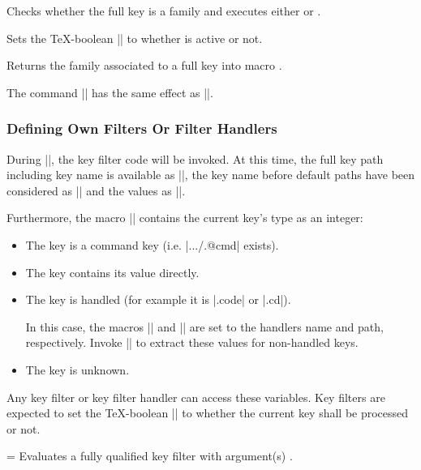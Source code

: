 \begin{command}{\pgfkeysiffamilydefined{}}%
	Checks whether the full key  is a family and executes either  or .
\end{command}

\begin{command}{\pgfkeysisfamilyactive{}}%
	Sets the \TeX-boolean |\ifpgfkeysfiltercontinue| to whether  is active or not.
\end{command}

\begin{command}{\pgfkeysgetfamily{}}%
	Returns the family associated to a full key  into macro .
\end{command}

\begin{command}{\pgfkeyssetfamily{}}%
	The command |\pgfkeyssetfamily| has the same effect as ||.
\end{command}

\subsubsection{Defining Own Filters Or Filter Handlers}
\label{section-key-writing-filters}
	During |\pgfkeysfiltered|, the key filter code will be invoked. At this time, the full key path including key name is available as |\pgfkeyscurrentkey|, the key name before default paths have been considered as |\pgfkeyscurrentkeyRAW| and the values as |\pgfkeyscurrentvalue|.

	Furthermore, the macro |\pgfkeyscasenumber| contains the current key's type as an integer:
\begin{itemize}
\item[\meta{1}] The key is a command key (i.e. |.../.@cmd| exists).
\item[\meta{2}] The key contains its value directly.
\item[\meta{3}] The key is handled (for example it is |.code| or |.cd|).

In this case, the macros |\pgfkeyscurrentname| and |\pgfkeyscurrentpath| are set to the handlers name and path, respectively.
Invoke |\pgfkeyssplitpath{}| to extract these values for non-handled keys.
\item[\meta{0}] The key is unknown.
\end{itemize}
	Any key filter or key filter handler can access these variables. Key filters are expected to set the \TeX-boolean |\ifpgfkeysfiltercontinue| to whether the current key shall be processed or not.

\begin{command}{\pgfkeysevalkeyfilterwith{}=}
	Evaluates a fully qualified key filter  with argument(s) .
\begin{codeexample}
\end{codeexample}
\end{command}
\endgroup
